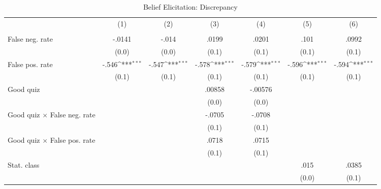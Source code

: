\begin{table}[htbp]\centering
\def\sym#1{\ifmmode^{#1}\else\(^{#1}\)\fi}
\caption{Belief Elicitation: Discrepancy}
\begin{tabular}{l*{6}{c}}
\hline\hline
                &\multicolumn{1}{c}{(1)}&\multicolumn{1}{c}{(2)}&\multicolumn{1}{c}{(3)}&\multicolumn{1}{c}{(4)}&\multicolumn{1}{c}{(5)}&\multicolumn{1}{c}{(6)}\\
                &\multicolumn{1}{c}{}&\multicolumn{1}{c}{}&\multicolumn{1}{c}{}&\multicolumn{1}{c}{}&\multicolumn{1}{c}{}&\multicolumn{1}{c}{}\\
\hline
False neg. rate &   -.0141         &    -.014         &    .0199         &    .0201         &     .101         &    .0992         \\
                &    (0.0)         &    (0.0)         &    (0.1)         &    (0.1)         &    (0.1)         &    (0.1)         \\
False pos. rate &    -.546\sym{***}&    -.547\sym{***}&    -.578\sym{***}&    -.579\sym{***}&    -.596\sym{***}&    -.594\sym{***}\\
                &    (0.1)         &    (0.1)         &    (0.1)         &    (0.1)         &    (0.1)         &    (0.1)         \\
Good quiz       &                  &                  &   .00858         &  -.00576         &                  &                  \\
                &                  &                  &    (0.0)         &    (0.0)         &                  &                  \\
Good quiz $\times$ False neg. rate&                  &                  &   -.0705         &   -.0708         &                  &                  \\
                &                  &                  &    (0.1)         &    (0.1)         &                  &                  \\
Good quiz $\times$ False pos. rate&                  &                  &    .0718         &    .0715         &                  &                  \\
                &                  &                  &    (0.1)         &    (0.1)         &                  &                  \\
Stat. class     &                  &                  &                  &                  &     .015         &    .0385         \\
                &                  &                  &                  &                  &    (0.0)         &    (0.1)         \\

\end{tabular}
\end{table}
